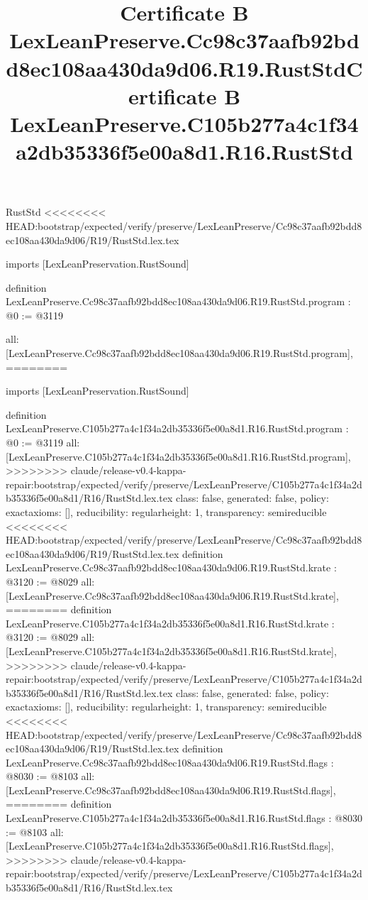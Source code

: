 \begin{lexlean}{RustStd}
<<<<<<<< HEAD:bootstrap/expected/verify/preserve/LexLeanPreserve/Cc98c37aafb92bdd8ec108aa430da9d06/R19/RustStd.lex.tex
\title{Certificate B LexLeanPreserve.Cc98c37aafb92bdd8ec108aa430da9d06.R19.RustStd}
\begin{coremodule}
imports [LexLeanPreservation.RustSound]

definition LexLeanPreserve.Cc98c37aafb92bdd8ec108aa430da9d06.R19.RustStd.program : @0 := @3119 {
  all: [LexLeanPreserve.Cc98c37aafb92bdd8ec108aa430da9d06.R19.RustStd.program],
========
\title{Certificate B LexLeanPreserve.C105b277a4c1f34a2db35336f5e00a8d1.R16.RustStd}
\begin{coremodule}
imports [LexLeanPreservation.RustSound]

definition LexLeanPreserve.C105b277a4c1f34a2db35336f5e00a8d1.R16.RustStd.program : @0 := @3119 {
  all: [LexLeanPreserve.C105b277a4c1f34a2db35336f5e00a8d1.R16.RustStd.program],
>>>>>>>> claude/release-v0.4-kappa-repair:bootstrap/expected/verify/preserve/LexLeanPreserve/C105b277a4c1f34a2db35336f5e00a8d1/R16/RustStd.lex.tex
  class: false,
  generated: false,
  policy: exact{axioms: []},
  reducibility: regular{height: 1},
  transparency: semireducible
}
<<<<<<<< HEAD:bootstrap/expected/verify/preserve/LexLeanPreserve/Cc98c37aafb92bdd8ec108aa430da9d06/R19/RustStd.lex.tex
definition LexLeanPreserve.Cc98c37aafb92bdd8ec108aa430da9d06.R19.RustStd.krate : @3120 := @8029 {
  all: [LexLeanPreserve.Cc98c37aafb92bdd8ec108aa430da9d06.R19.RustStd.krate],
========
definition LexLeanPreserve.C105b277a4c1f34a2db35336f5e00a8d1.R16.RustStd.krate : @3120 := @8029 {
  all: [LexLeanPreserve.C105b277a4c1f34a2db35336f5e00a8d1.R16.RustStd.krate],
>>>>>>>> claude/release-v0.4-kappa-repair:bootstrap/expected/verify/preserve/LexLeanPreserve/C105b277a4c1f34a2db35336f5e00a8d1/R16/RustStd.lex.tex
  class: false,
  generated: false,
  policy: exact{axioms: []},
  reducibility: regular{height: 1},
  transparency: semireducible
}
<<<<<<<< HEAD:bootstrap/expected/verify/preserve/LexLeanPreserve/Cc98c37aafb92bdd8ec108aa430da9d06/R19/RustStd.lex.tex
definition LexLeanPreserve.Cc98c37aafb92bdd8ec108aa430da9d06.R19.RustStd.flags : @8030 := @8103 {
  all: [LexLeanPreserve.Cc98c37aafb92bdd8ec108aa430da9d06.R19.RustStd.flags],
========
definition LexLeanPreserve.C105b277a4c1f34a2db35336f5e00a8d1.R16.RustStd.flags : @8030 := @8103 {
  all: [LexLeanPreserve.C105b277a4c1f34a2db35336f5e00a8d1.R16.RustStd.flags],
>>>>>>>> claude/release-v0.4-kappa-repair:bootstrap/expected/verify/preserve/LexLeanPreserve/C105b277a4c1f34a2db35336f5e00a8d1/R16/RustStd.lex.tex
}}}
\end{coremodule}}
\end{coremodule}
\end{lexlean}
